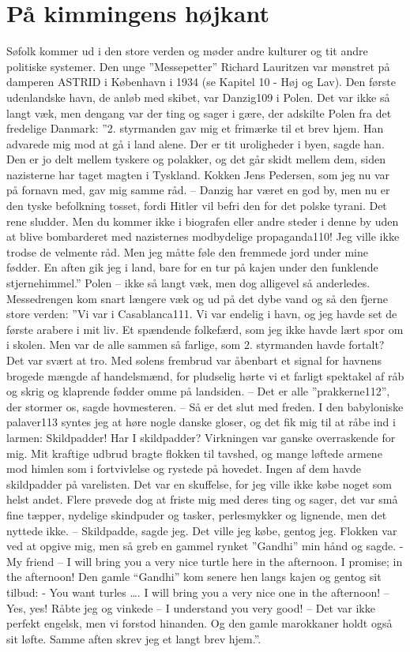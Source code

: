 \chapter{På kimmingens højkant}\label{puxe5-kimmingens-huxf8jkant}

Søfolk kommer ud i den store verden og møder andre kulturer og tit andre
politiske systemer. Den unge ''Messepetter'' Richard Lauritzen var
mønstret på damperen ASTRID i København i 1934 (se Kapitel 10 - Høj og
Lav). Den første udenlandske havn, de anløb med skibet, var Danzig109 i
Polen. Det var ikke så langt væk, men dengang var der ting og sager i
gære, der adskilte Polen fra det fredelige Danmark: ''2. styrmanden gav
mig et frimærke til et brev hjem. Han advarede mig mod at gå i land
alene. Der er tit uroligheder i byen, sagde han. Den er jo delt mellem
tyskere og polakker, og det går skidt mellem dem, siden nazisterne har
taget magten i Tyskland. Kokken Jens Pedersen, som jeg nu var på fornavn
med, gav mig samme råd. -- Danzig har været en god by, men nu er den
tyske befolkning tosset, fordi Hitler vil befri den for det polske
tyrani. Det rene sludder. Men du kommer ikke i biografen eller andre
steder i denne by uden at blive bombarderet med nazisternes modbydelige
propaganda110! Jeg ville ikke trodse de velmente råd. Men jeg måtte føle
den fremmede jord under mine fødder. En aften gik jeg i land, bare for
en tur på kajen under den funklende stjernehimmel.'' Polen -- ikke så
langt væk, men dog alligevel så anderledes. Messedrengen kom snart
længere væk og ud på det dybe vand og så den fjerne store verden: ''Vi
var i Casablanca111. Vi var endelig i havn, og jeg havde set de første
arabere i mit liv. Et spændende folkefærd, som jeg ikke havde lært spor
om i skolen. Men var de alle sammen så farlige, som 2. styrmanden havde
fortalt? Det var svært at tro. Med solens frembrud var åbenbart et
signal for havnens brogede mængde af handelsmænd, for pludselig hørte vi
et farligt spektakel af råb og skrig og klaprende fødder omme på
landsiden. -- Det er alle ''prakkerne112'', der stormer os, sagde
hovmesteren. -- Så er det slut med freden. I den babyloniske palaver113
syntes jeg at høre nogle danske gloser, og det fik mig til at råbe ind i
larmen: Skildpadder! Har I skildpadder? Virkningen var ganske
overraskende for mig. Mit kraftige udbrud bragte flokken til tavshed, og
mange løftede armene mod himlen som i fortvivlelse og rystede på
hovedet. Ingen af dem havde skildpadder på varelisten. Det var en
skuffelse, for jeg ville ikke købe noget som helst andet. Flere prøvede
dog at friste mig med deres ting og sager, det var små fine tæpper,
nydelige skindpuder og tasker, perlesmykker og lignende, men det nyttede
ikke. -- Skildpadde, sagde jeg. Det ville jeg købe, gentog jeg. Flokken
var ved at opgive mig, men så greb en gammel rynket ''Gandhi'' min hånd
og sagde. - My friend -- I will bring you a very nice turtle here in the
afternoon. I promise; in the afternoon! Den gamle ``Gandhi'' kom senere
hen langs kajen og gentog sit tilbud: - You want turles \ldots{}. I will
bring you a very nice one in the afternoon! -- Yes, yes! Råbte jeg og
vinkede -- I understand you very good! -- Det var ikke perfekt engelsk,
men vi forstod hinanden. Og den gamle marokkaner holdt også sit løfte.
Samme aften skrev jeg et langt brev hjem.''.

